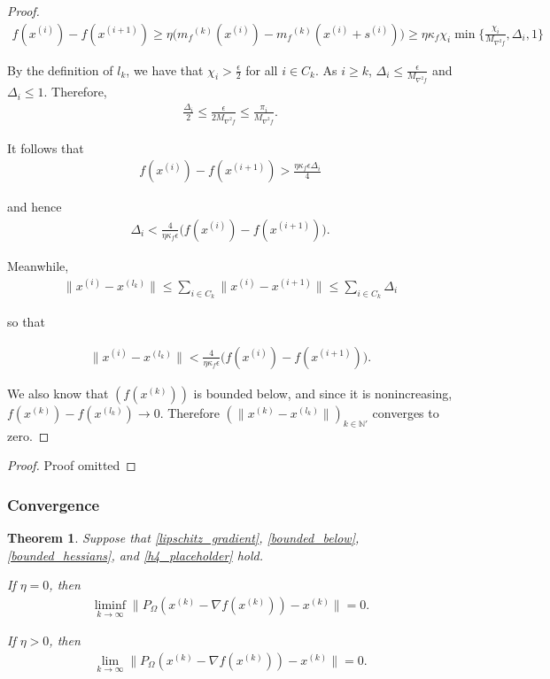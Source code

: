 \documentclass{article}
\newtheorem{theorem}{Theorem}[section]
\theoremstyle{case}
\newcommand{\xk}{{x^{(k)}}}
\newcommand{\mfk}{{{m}_f}^{(k)}}
\newcommand{\ints}{\mathbb N} %
\newcommand{\grad}{\nabla f}
\newcommand{\hfb}{{M_{\nabla^2 f}}}
\begin{document}
\begin{proof}
\begin{align}
f(x^{(i)}) - f(x^{(i+1)}) \ge \eta\big ( \mfk(x^{(i)}) - \mfk(x^{(i)} + s^{(i)}) \big ) \ge \eta \kappa_f \chi_i \min\{\frac{\chi_{i}}{\hfb}, \Delta_i, 1\} 
\end{align}

By the definition of $l_k$, we have that $\chi_i > \frac{\epsilon}{2}$ for all $i \in C_k$.
As $i \ge k$, $\Delta_i \le \frac{\epsilon}{\hfb}$ and $\Delta_i \le 1$.
Therefore,
\begin{align}
\frac{\Delta_i}{2} \le \frac{\epsilon}{2 \hfb} \le \frac{\pi_i}{\hfb}.
\end{align}

It follows that
\begin{align}
f(x^{(i)}) - f(x^{(i+1)}) > \frac{\eta \kappa_f \epsilon \Delta_i}{4}
\end{align}

and hence
\begin{align}
\Delta_i < \frac{4}{\eta \kappa_f \epsilon} \big ( f(x^{(i)}) - f(x^{(i+1)})\big ).
\end{align}

Meanwhile,
\begin{align}
\|x^{(i)} - x^{(l_k)}\| \le \sum_{i \in C_k}\|x^{(i)} - x^{(i+1)}\| \le \sum_{i \in C_k} \Delta_i
\end{align}

so that

\begin{align}
\|x^{(i)} - x^{(l_k)}\| < \frac{4}{\eta \kappa_f \epsilon} \big ( f(x^{(i)}) - f(x^{(i+1)})\big ).
\end{align}

We also know that $(f(\xk))$ is bounded below, and since it is nonincreasing, $f(\xk)  - f(x^{(l_k)}) \to 0$.
Therefore $(\|\xk - x^{(l_k)}\|)_{k \in \ints '}$ converges to zero.
\end{proof}
\else
\begin{proof}
Proof omitted
\end{proof}
\fi

\subsubsection{Convergence}

\begin{theorem}
Suppose that \cref{lipschitz_gradient}, \cref{bounded_below}, \cref{bounded_hessians}, and \cref{h4_placeholder} hold.

If $\eta = 0$, then
\begin{align}
\liminf_{k\to\infty} \|P_{\Omega}(\xk - \grad(\xk)) - \xk \| = 0.
\end{align}

If $\eta > 0$, then
\begin{align}
\lim_{k\to\infty} \|P_{\Omega}(\xk - \grad(\xk)) - \xk \| = 0.
\end{align}

\end{theorem}
\end{document}
